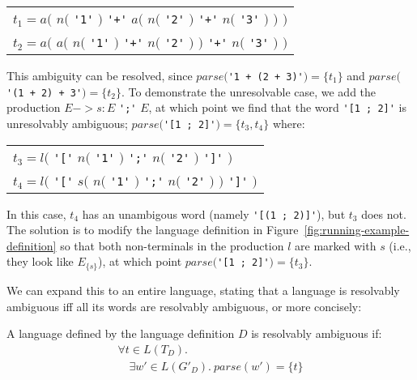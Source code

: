 \documentclass[acmsmall,review,anonymous]{acmart}\settopmatter{printfolios=true,printccs=false,printacmref=false}
\newcommand{\parse}{\mathit{parse}} %
\begin{document}
\begin{center}
  \begin{tabular}{l}
    $t_1 = a($ \hphantom{$a($} $n($ \verb|'1'| $)$ \verb|'+'| $a($ $n($ \verb|'2'| $)$ \hphantom{$)$} \verb|'+'| $n($ \verb|'3'| $)$ $)$ $)$ \\
    $t_2 = a($ $a($ $n($ \verb|'1'| $)$ \verb|'+'| \hphantom{$a($} $n($ \verb|'2'| $)$ $)$ \verb|'+'| $n($ \verb|'3'| $)$ \hphantom{$)$} $)$ \\
  \end{tabular}
\end{center}

\noindent This ambiguity can be resolved, since $\parse($\verb|'1 + (2 + 3)'|$) = \{t_1\}$ and $\parse($\verb|'(1 + 2) + 3'|$) = \{t_2\}$. To demonstrate the unresolvable case, we add the production $E -> s: E$ \verb|';'| $E$, at which point we find that the word \verb|'[1 ; 2]'| is unresolvably ambiguous; $\parse($\verb|'[1 ; 2]'|$) = \{t_3, t_4\}$ where:

\begin{center}
  \begin{tabular}{l}
    $t_3 = l($ \verb|'['| \hphantom{$s($} $n($ \verb|'1'| $)$ \verb|';'| $n($ \verb|'2'| $)$ \hphantom{$)$} \verb|']'| $)$ \\
    $t_4 = l($ \verb|'['| $s($ $n($ \verb|'1'| $)$ \verb|';'| $n($ \verb|'2'| $)$ $)$ \verb|']'| $)$ \\
  \end{tabular}
\end{center}

\noindent In this case, $t_4$ has an unambigous word (namely \verb|'[(1 ; 2)]'|), but $t_3$ does not. The solution is to modify the language definition in Figure~\ref{fig:running-example-definition} so that both non-terminals in the production $l$ are marked with $s$ (i.e., they look like $E_{\{s\}}$), at which point $\parse($\verb|'[1 ; 2]'|$) = \{t_3\}$.

We can expand this to an entire language, stating that a language is resolvably ambiguous iff all its words are resolvably ambiguous, or more concisely:

\begin{definition}
  A language defined by the language definition $D$ is resolvably ambiguous if:
  $$
  \begin{array}{l}
  \forall t \in L(T_D).\\
  \quad \exists w' \in L(G'_D).\ \parse(w') = \{t\}
  \end{array}
  $$
\end{definition}
\end{document}
